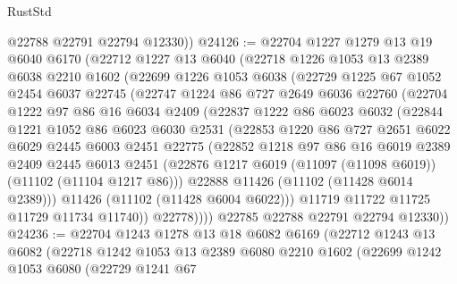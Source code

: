 \begin{lexlean}{RustStd}
\begin{coremodule}
        @22788
        @22791
        @22794
        @12330))
@24126 := @22704
    @1227
    @1279
    @13
    @19
    @6040
    @6170
    (@22712
      @1227
      @13
      @6040
      (@22718
        @1226
        @1053
        @13
        @2389
        @6038
        @2210
        @1602
        (@22699
          @1226
          @1053
          @6038
          (@22729
            @1225
            @67
            @1052
            @2454
            @6037
            @22745
            (@22747
              @1224
              @86
              @727
              @2649
              @6036
              @22760
              (@22704
                @1222
                @97
                @86
                @16
                @6034
                @2409
                (@22837
                  @1222
                  @86
                  @6023
                  @6032
                  (@22844
                    @1221
                    @1052
                    @86
                    @6023
                    @6030
                    @2531
                    (@22853
                      @1220
                      @86
                      @727
                      @2651
                      @6022
                      @6029
                      @2445
                      @6003
                      @2451
                      @22775
                      (@22852
                        @1218
                        @97
                        @86
                        @16
                        @6019
                        @2389
                        @2409
                        @2445
                        @6013
                        @2451
                        (@22876 @1217 @6019 (@11097 (@11098 @6019)) (@11102 (@11104 @1217 @86)))
                        @22888
                        @11426
                        (@11102 (@11428 @6014 @2389)))
                      @11426
                      (@11102 (@11428 @6004 @6022)))
                    @11719
                    @11722
                    @11725
                    @11729
                    @11734
                    @11740))
                @22778))))
        @22785
        @22788
        @22791
        @22794
        @12330))
@24236 := @22704
    @1243
    @1278
    @13
    @18
    @6082
    @6169
    (@22712
      @1243
      @13
      @6082
      (@22718
        @1242
        @1053
        @13
        @2389
        @6080
        @2210
        @1602
        (@22699
          @1242
          @1053
          @6080
          (@22729
            @1241
            @67

\end{coremodule}
\end{lexlean}
